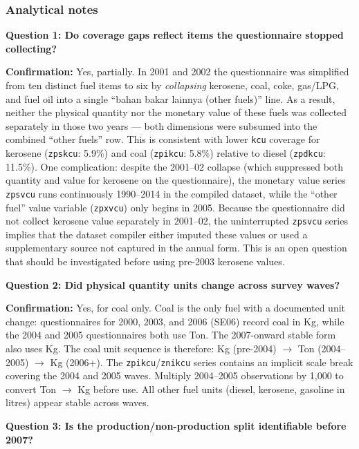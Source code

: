 \documentclass[11pt, a4paper]{article}
\begin{document}
\subsubsection*{Analytical notes}
\label{sec:analyticalnotes}

\noindent\textbf{Question 1: Do coverage gaps reflect items the questionnaire stopped collecting?}

\noindent\textbf{Confirmation:} Yes, partially.
In 2001 and 2002 the questionnaire was simplified from ten distinct fuel items to six by
\textit{collapsing} kerosene, coal, coke, gas/LPG, and fuel oil into a single
``bahan bakar lainnya (other fuels)'' line. As a result, neither the physical quantity
nor the monetary value of these fuels was collected separately in those two years ---
both dimensions were subsumed into the combined ``other fuels'' row.
This is consistent with lower \texttt{kcu} coverage for kerosene (\texttt{zpskcu}: 5.9\%) and
coal (\texttt{zpikcu}: 5.8\%) relative to diesel (\texttt{zpdkcu}: 11.5\%).
One complication: despite the 2001--02 collapse (which suppressed both quantity and
value for kerosene on the questionnaire), the monetary value series \texttt{zpsvcu} runs
continuously 1990--2014 in the compiled dataset, while the ``other fuel'' value variable
(\texttt{zpxvcu}) only begins in 2005. Because the questionnaire did not collect kerosene
value separately in 2001--02, the uninterrupted \texttt{zpsvcu} series implies that the
dataset compiler either imputed these values or used a supplementary source not captured
in the annual form. This is an open question that should be investigated before using
pre-2003 kerosene values.

\noindent\textbf{Question 2: Did physical quantity units change across survey waves?}

\noindent\textbf{Confirmation:} Yes, for coal only.
Coal is the only fuel with a documented unit change: questionnaires for 2000, 2003, and 2006 (SE06)
record coal in Kg, while the 2004 and 2005 questionnaires both use Ton.
The 2007-onward stable form also uses Kg.
The coal unit sequence is therefore: Kg (pre-2004) $\to$ Ton (2004--2005) $\to$ Kg (2006+).
The \texttt{zpikcu}/\texttt{znikcu} series contains an implicit scale break covering the
2004 and 2005 waves. Multiply 2004--2005 observations by 1{,}000 to convert Ton $\to$ Kg
before use.
All other fuel units (diesel, kerosene, gasoline in litres) appear stable across waves.

\noindent\textbf{Question 3: Is the production/non-production split identifiable before 2007?}
\end{document}
